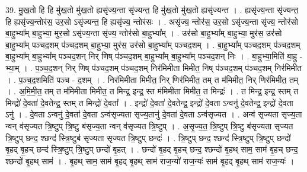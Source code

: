 \documentclass[17pt]{extarticle}
\begin{document}
39. मु॒ख॒तो हि हि मु॑ख॒तो मु॑ख॒तो ह्यसृ॑ज्य॒न्ता सृ॑ज्यन्त॒ हि मु॑ख॒तो मु॑ख॒तो ह्यसृ॑ज्यन्त । . ह्यसृ॑ज्य॒न्ता सृ॑ज्यन्त॒ हि ह्यसृ॑ज्य॒न्तोर॑स॒ उर॒सो ऽसृ॑ज्यन्त॒ हि ह्यसृ॑ज्य॒ न्तोर॑सः । . असृ॑ज्य॒ न्तोर॑स॒ उर॒सो ऽसृ॑ज्य॒न्ता सृ॑ज्य॒ न्तोर॑सो बा॒हुभ्या᳚म् बा॒हुभ्या॒ मुर॒सो ऽसृ॑ज्य॒न्ता सृ॑ज्य॒
न्तोर॑सो बा॒हुभ्या᳚म् । . उर॑सो बा॒हुभ्या᳚म् बा॒हुभ्या॒ मुर॑स॒ उर॑सो बा॒हुभ्या᳚म् पञ्चद॒शम् प॑ञ्चद॒शम् बा॒हुभ्या॒ मुर॑स॒ उर॑सो बा॒हुभ्या᳚म् पञ्चद॒शम् । . बा॒हुभ्या᳚म् पञ्चद॒शम् प॑ञ्चद॒शम् बा॒हुभ्या᳚म् बा॒हुभ्या᳚म् पञ्चद॒शन् निर् णिष् प॑ञ्चद॒शम् बा॒हुभ्या᳚म् बा॒हुभ्या᳚म् पञ्चद॒शन् निः । . बा॒हुभ्या॒मिति॑ बा॒हु - भ्या॒म् । . प॒ञ्च॒द॒शन् निर् णिष् प॑ञ्चद॒शम् प॑ञ्चद॒शम् निर॑मिमीता मिमीत॒ निष् प॑ञ्चद॒शम् प॑ञ्चद॒शम् निर॑मिमीत । . प॒ञ्च॒द॒शमिति॑ पञ्च - द॒शम् । . निर॑मिमीता मिमीत॒ निर् णिर॑मिमीत॒ तम् त म॑मिमीत॒ निर् णिर॑मिमीत॒ तम् । . अ॒मि॒मी॒त॒ तम् त म॑मिमीता मिमीत॒ त मिन्द्र॒ इन्द्र॒ स्त म॑मिमीता मिमीत॒ त मिन्द्रः॑ । . त मिन्द्र॒ इन्द्र॒ स्तम् त मिन्द्रो॑ दे॒वता॑ दे॒वतेन्द्र॒ स्तम् त मिन्द्रो॑ दे॒वता᳚ । . इन्द्रो॑ दे॒वता॑ दे॒वतेन्द्र॒ इन्द्रो॑ दे॒वता ऽन्वनु॑ दे॒वतेन्द्र॒ इन्द्रो॑ दे॒वता ऽनु॑ । . दे॒वता ऽन्वनु॑ दे॒वता॑ दे॒वता ऽन्व॑सृज्यता सृज्य॒तानु॑ दे॒वता॑ दे॒वता ऽन्व॑सृज्यत । . अन्व॑ सृज्यता सृज्य॒ता न्वन् व॑सृज्यत त्रि॒ष्टुप् त्रि॒ष्टु ब॑सृज्य॒ता न्वन् व॑सृज्यत त्रि॒ष्टुप् । . अ॒सृ॒ज्य॒त॒ त्रि॒ष्टुप् त्रि॒ष्टु ब॑सृज्यता सृज्यत त्रि॒ष्टुप् छन्द॒ श्छन्द॑ स्त्रि॒ष्टुब॑ सृज्यता सृज्यत त्रि॒ष्टुप् छन्दः॑ । . त्रि॒ष्टुप् छन्द॒ श्छन्द॑ स्त्रि॒ष्टुप् त्रि॒ष्टुप् छन्दो॑ बृ॒हद् बृ॒हच् छन्द॑ स्त्रि॒ष्टुप् त्रि॒ष्टुप् छन्दो॑ बृ॒हत् । . छन्दो॑ बृ॒हद् बृ॒हच् छन्द॒ श्छन्दो॑ बृ॒हथ् साम॒ साम॑ बृ॒हच् छन्द॒ श्छन्दो॑ बृ॒हथ् साम॑ । . बृ॒हथ् साम॒ साम॑ बृ॒हद् बृ॒हथ् साम॑ राज॒न्यो॑ राज॒न्यः॑ साम॑ बृ॒हद् बृ॒हथ् साम॑ राज॒न्यः॑ । \newline
\pagebreak
{}
\end{document}
